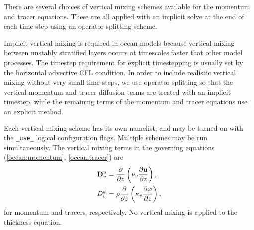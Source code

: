 There are several choices of vertical mixing schemes available for the 
momentum and tracer equations.  These are all applied with an implicit solve at the end of each time step using an operator splitting scheme.  

Implicit vertical mixing is required in ocean models because vertical mixing between unstably stratified layers occurs at timescales faster that other model processes.  The timestep requirement for explicit timestepping is usually set by the horizontal advective CFL condition.  In order to include realistic vertical mixing without very small time steps, we use operator splitting so that the vertical momentum and tracer diffusion terms are treated with an implicit timestep, while the remaining terms of the momentum and tracer equations use an explicit method.

Each vertical mixing scheme has its own namelist, and may be turned
on with the \verb|_use_| logical configuration flags.  Multiple
schemes may be run simultaneously.  The vertical mixing terms in the
governing equations (\ref{ocean:momentum}, \ref{ocean:tracer}) are 
\begin{eqnarray} 
\label{ocean:\mode_v_mom_diff}
& \displaystyle {\bf D}^u_v=\frac{\partial }{\partial z} 
\left( \nu_v \frac{\partial {\bf u}}{\partial z} \right), \\
\label{\mode_v_tr_diff}
& \displaystyle D^\varphi_v = \rho \frac{\partial }{\partial z} 
  \left( \kappa_v \frac{\partial \varphi}{\partial z} \right),
\end{eqnarray}
for momentum and tracers, respectively.  No vertical mixing is applied to the
thickness equation.
